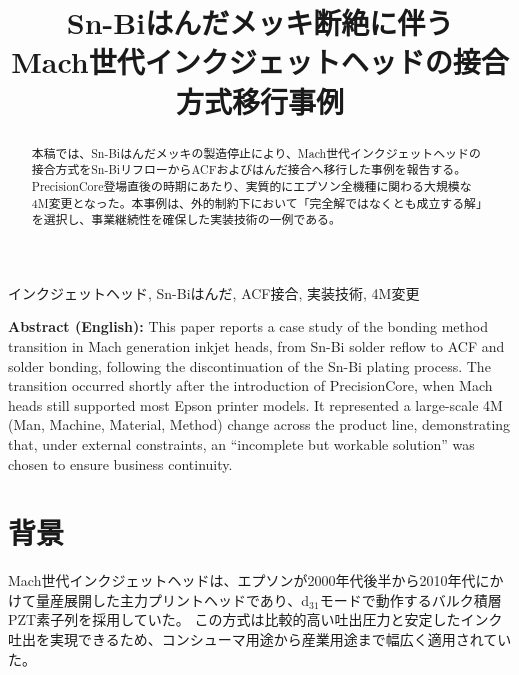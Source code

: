 \documentclass[conference]{IEEEtran}
\begin{document}
\title{Sn-Biはんだメッキ断絶に伴う\\Mach世代インクジェットヘッドの接合方式移行事例}

\author{%
}

\maketitle

\begin{abstract}
本稿では、Sn-Biはんだメッキの製造停止により、Mach世代インクジェットヘッドの接合方式をSn-BiリフローからACFおよびはんだ接合へ移行した事例を報告する。PrecisionCore登場直後の時期にあたり、実質的にエプソン全機種に関わる大規模な4M変更となった。本事例は、外的制約下において「完全解ではなくとも成立する解」を選択し、事業継続性を確保した実装技術の一例である。
\end{abstract}

\begin{IEEEkeywords}
インクジェットヘッド, Sn-Biはんだ, ACF接合, 実装技術, 4M変更
\end{IEEEkeywords}

\vspace{1em}
\noindent
\textbf{Abstract (English):}  
This paper reports a case study of the bonding method transition in Mach generation inkjet heads, from Sn-Bi solder reflow to ACF and solder bonding, following the discontinuation of the Sn-Bi plating process.  
The transition occurred shortly after the introduction of PrecisionCore, when Mach heads still supported most Epson printer models.  
It represented a large-scale 4M (Man, Machine, Material, Method) change across the product line, demonstrating that, under external constraints, an “incomplete but workable solution” was chosen to ensure business continuity.

\section{背景}

Mach世代インクジェットヘッドは、エプソンが2000年代後半から2010年代にかけて量産展開した主力プリントヘッドであり、d$_{31}$モードで動作するバルク積層PZT素子列を採用していた。  
この方式は比較的高い吐出圧力と安定したインク吐出を実現できるため、コンシューマ用途から産業用途まで幅広く適用されていた。  
\end{document}
